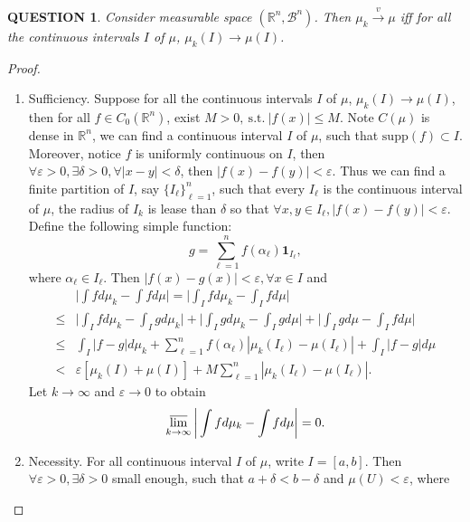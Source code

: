 \documentclass[12pt]{article}
\renewcommand{\b}{\mathscr{B}}
\renewcommand{\i}{\bm{1}}
\renewcommand{\(}{\left(}%
\renewcommand{\)}{\right)}%
\renewcommand{\[}{\left[}%
\renewcommand{\]}{\right]}%
\renewcommand{\r}{\mathbb{R}}
\newcommand{\st}{\mathrm{\ s.t.\ }}
\newtheorem{question}{QUESTION}[section]}
\newtheorem{proof}{Proof.}}
\begin{document}
  \begin{question}
   Consider measurable space $(\r^n,\b^n)$. Then $\mu_k\overset{v}{\to}\mu$ iff for all the continuous intervals $I$ of $\mu$, $\mu_k(I)\to \mu(I)$.
  \end{question}
  \begin{proof}
   \begin{enumerate}[\itshape (1)]
    \item Sufficiency. Suppose for all the continuous intervals $I$ of $\mu$, $\mu_k(I)\to \mu(I)$, then for all $f\in C_0(\r^n)$, exist $M>0,\st |f(x)|\leq M$. Note $C(\mu)$ is dense in $\r^n$, we can find a continuous interval $I$ of $\mu$, such that $\mathrm{supp}(f)\subset I$. Moreover, notice $f$ is uniformly continuous on $I$, then $\forall\varepsilon>0,\exists \delta>0,\forall |x-y|<\delta$, then $|f(x)-f(y)|<\varepsilon$. Thus we can find a finite partition of $I$, say $\{I_\ell\}_{\ell=1}^n$, such that every $I_\ell$ is the continuous interval of $\mu$, the radius of $I_k$ is lease than $\delta$ so that $\forall x,y\in I_\ell,|f(x)-f(y)|<\varepsilon$. Define the following simple function:
    \begin{equation*}
     g=\sum_{\ell=1}^nf(\alpha_\ell)\i_{I_\ell},
    \end{equation*}
    where $\alpha_\ell\in I_\ell$. Then $|f(x)-g(x)|<\varepsilon,\forall x\in I$ and
    \begin{equation*}
     \begin{split}
      &\bigg|\int fd\mu_k-\int fd\mu\bigg|=\bigg|\int_I fd\mu_k-\int_I fd\mu\bigg|\\
      \leq &\bigg|\int_I fd\mu_k-\int_I gd\mu_k\bigg|+\bigg|\int_I gd\mu_k-\int_I gd\mu\bigg|+\bigg|\int_I gd\mu-\int_I fd\mu\bigg|\\
      \leq &\int_I|f-g|d\mu_k+\sum_{\ell=1}^nf(\alpha_\ell)|\mu_k(I_\ell)-\mu(I_\ell)|+\int_I|f-g|d\mu\\
      <&\varepsilon\[\mu_k(I)+\mu(I)\]+M\sum_{\ell=1}^n|\mu_k(I_\ell)-\mu(I_\ell)|.
     \end{split}
    \end{equation*}
    Let $k\to\infty$ and $\varepsilon\to0$ to obtain
    \begin{equation*}
     \varlimsup_{k\to\infty}\bigg|\int fd\mu_k-\int fd\mu\bigg|=0.
    \end{equation*}
    \item Necessity. For all continuous interval $I$ of $\mu$, write $I=[a,b]$. Then $\forall\varepsilon>0,\exists\delta>0$ small enough, such that $a+\delta<b-\delta$ and $\mu(U)<\varepsilon$, where

\end{enumerate}
\end{proof}
\end{document}
